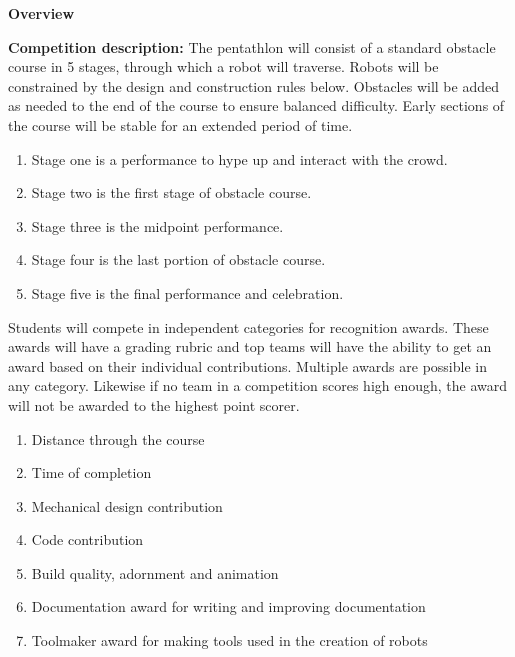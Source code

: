 \documentclass{article}
\begin{document}
{\huge \textbf{Overview}}
\vspace{1cm}

\textbf{Competition description:} The pentathlon will consist of a standard obstacle course in 5 stages, through which a robot will traverse. Robots will be constrained by the design and construction rules below. Obstacles will be added as needed to the end of the course to ensure balanced difficulty. Early sections of the course will be stable for an extended period of time. 
\begin{enumerate}
\item Stage one is a performance to hype up and interact with the crowd.

\item Stage two is the first stage of obstacle course. 

\item Stage three is the midpoint performance.

\item Stage four is the last portion of obstacle course. 

\item Stage five is the final performance and celebration. 
\end{enumerate}

Students will compete in independent categories for recognition awards. These awards will have a grading rubric and top teams will have the ability to get an award based on their individual contributions. Multiple awards are possible in any category. Likewise if no team in a competition scores high enough, the award will not be awarded to the highest point scorer. 

\begin{enumerate}
	
\item Distance through the course
 
\item Time of completion
 
\item Mechanical design contribution
 
\item Code contribution
 
 \item Build quality, adornment and animation
 
 \item Documentation award for writing and improving documentation
 
 \item Toolmaker award for making tools used in the creation of robots
 
\end{enumerate}
\end{document}
